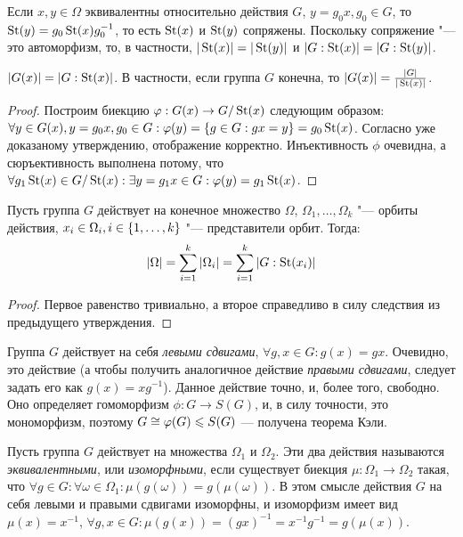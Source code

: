 \begin{corollary}
	Если $x, y \in \Omega$ эквивалентны относительно действия $G$, $y = g_0x, g_0 \in G$, то $\operatorname{St}(y) = g_0\operatorname{St}(x)g_0^{-1}$, то есть $\operatorname{St}(x)$ и $\operatorname{St}(y)$ сопряжены. Поскольку сопряжение "--- это автоморфизм, то, в частности, $|\operatorname{St}(x)| = |\operatorname{St}(y)|$ и $|G : \operatorname{St}(x)| = |G : \operatorname{St}(y)|$.
\end{corollary}

\begin{corollary}
	$|G(x)| = |G : \operatorname{St}(x)|$. В частности, если группа $G$ конечна, то $|G(x)| = \frac{|G|}{|\operatorname{St}(x)|}$.
\end{corollary}

\begin{proof}
	Построим биекцию $\varphi: G(x) \to G / \operatorname{St}(x)$ следующим образом: $\forall y \hm\in G(x), y = g_0x, g_0 \in G: \phi(y) = \{g \in G: gx = y\} \hm= g_0\St(x)$. Согласно уже доказаному утверждению, отображение корректно. Инъективность $\phi$ очевидна, а сюръективность выполнена потому, что $\forall g_1\St(x) \in G / \St(x): \exists y = g_1x \in G: \phi(y) \hm= g_1\St(x)$.
\end{proof}

\begin{theorem}
	Пусть группа $G$ действует на конечное множество $\Omega$, $\Omega_1, \dotsc, \Omega_k$ "--- орбиты действия, $x_i \in \Omega_i, i \hm\in \{1, \dotsc, k\}$ "--- представители орбит. Тогда:
	\[|\Omega| = \sum\limits_{i = 1}^k|\Omega_i| = \sum\limits_{i = 1}^k|G : \operatorname{St}(x_i)|\]
\end{theorem}

\begin{proof}
	Первое равенство тривиально, а второе справедливо в силу следствия из предыдущего утверждения.
\end{proof}

\begin{example}
	Группа $G$ действует на себя \textit{левыми сдвигами}, $\forall g, x \in G: g(x) = gx$. Очевидно, это действие (а чтобы получить аналогичное действие \textit{правыми сдвигами}, следует задать его как $g(x) = xg^{-1}$). Данное действие точно, и, более того, свободно. Оно определяет гомоморфизм $\phi: G \to S(G)$, и, в силу точности, это мономорфизм, поэтому $G \cong \phi(G) \hm\le S(G)$ --- получена теорема Кэли.
\end{example}

\begin{note}
	Пусть группа $G$ действует на множества $\Omega_1$ и $\Omega_2$. Эти два действия называются \textit{эквивалентными}, или \textit{изоморфными}, если существует биекция $\mu: \Omega_1 \to \Omega_2$ такая, что $\forall g \in G: \forall \omega \in \Omega_1: \mu(g(\omega)) = g(\mu(\omega))$. В этом смысле действия $G$ на себя левыми и правыми сдвигами изоморфны, и изоморфизм имеет вид $\mu(x) = x^{-1}$, $\forall g, x \in G: \mu(g(x)) = (gx)^{-1} = x^{-1}g^{-1} = g(\mu(x))$.
\end{note}

